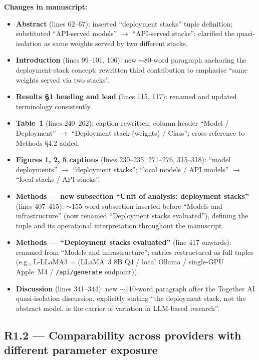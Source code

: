 \documentclass[11pt,a4paper]{article}
\newcommand{\changes}[1]{\par\noindent\textbf{\color{revblue}Changes in manuscript:} #1\par}
\begin{document}
\changes{
\begin{itemize}[leftmargin=*]
  \item \textbf{Abstract} (lines 62--67): inserted ``deployment stacks'' tuple definition; substituted ``API-served models'' $\rightarrow$ ``API-served stacks''; clarified the quasi-isolation as same weights served by two different stacks.
  \item \textbf{Introduction} (lines 99--101, 106): new $\sim$80-word paragraph anchoring the deployment-stack concept; rewritten third contribution to emphasise ``same weights served via two stacks''.
  \item \textbf{Results §1 heading and lead} (lines 115, 117): renamed and updated terminology consistently.
  \item \textbf{Table~1} (lines 240--262): caption rewritten; column header ``Model / Deployment'' $\rightarrow$ ``Deployment stack (weights) / Class''; cross-reference to Methods §4.2 added.
  \item \textbf{Figures 1, 2, 5 captions} (lines 230--235, 271--276, 315--318): ``model deployments'' $\rightarrow$ ``deployment stacks''; ``local models / API models'' $\rightarrow$ ``local stacks / API stacks''.
  \item \textbf{Methods --- new subsection ``Unit of analysis: deployment stacks''} (lines 407--415): $\sim$155-word subsection inserted before ``Models and infrastructure'' (now renamed ``Deployment stacks evaluated''), defining the tuple and its operational interpretation throughout the manuscript.
  \item \textbf{Methods --- ``Deployment stacks evaluated''} (line 417 onwards): renamed from ``Models and infrastructure''; entries restructured as full tuples (e.g., L-LLaMA3 = (LLaMA~3 8B Q4 / local Ollama / single-GPU Apple~M4 / \texttt{/api/generate} endpoint)).
  \item \textbf{Discussion} (lines 341--344): new $\sim$110-word paragraph after the Together AI quasi-isolation discussion, explicitly stating ``the deployment stack, not the abstract model, is the carrier of variation in LLM-based research''.
\end{itemize}
}

\subsection*{R1.2 --- Comparability across providers with different parameter exposure}
\end{document}
